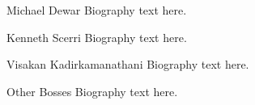 \documentclass[onecolumn,draftcls]{IEEEtran}
\begin{document}
\begin{IEEEbiography}{Michael Dewar}
Biography text here.
\end{IEEEbiography}

\begin{IEEEbiography}{Kenneth Scerri}
Biography text here.
\end{IEEEbiography}

\begin{IEEEbiography}{Visakan Kadirkamanathani}
Biography text here.
\end{IEEEbiography}

\begin{IEEEbiography}{Other Bosses}
Biography text here.
\end{IEEEbiography}

\end{document}
